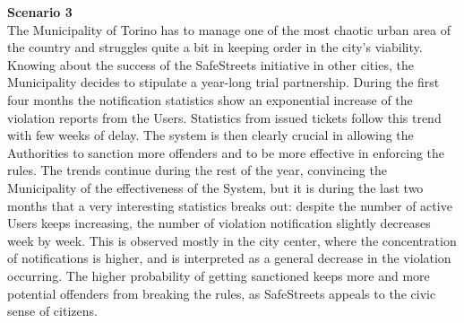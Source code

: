 \documentclass {article}
\begin{document}
		{\bf Scenario 3}\\
		The Municipality of Torino has to manage one of the most chaotic urban area of the country and struggles quite a bit in keeping order in the city’s \mbox{viability}. Knowing about the success of the SafeStreets initiative in other cities, the Municipality decides to stipulate a year-long trial partnership. During the first four months the notification statistics show an exponential increase of the \mbox{violation} reports from the Users. Statistics from issued tickets follow this trend with few weeks of delay. The system is then clearly crucial in allowing the Authorities to sanction more offenders and to be more effective in enforcing the rules. The trends continue during the rest of the year, convincing the \mbox{Municipality} of the effectiveness of the System, but it is during the last two months that a very interesting statistics breaks out: despite the number of active Users keeps increasing, the number of violation notification slightly decreases week by week. This is observed mostly in the city center, where the concentration of notifications is higher, and is interpreted as a general decrease in the violation occurring. The higher probability of getting sanctioned keeps more and more potential offenders from breaking the rules, as SafeStreets appeals to the civic sense of citizens.\\ \\
		
\end{document}

